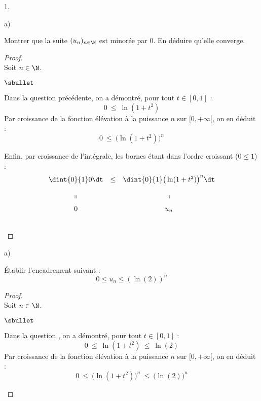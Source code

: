 \begin{noliste}{1.}
\begin{noliste}{a)}
  \item Montrer que la suite $(u_n)_{n \in \N}$ est minorée par
    $0$. En déduire qu'elle converge.

    \begin{proof}~\\%
      Soit $n \in \N$.
      \begin{noliste}{$\sbullet$}
      \item Dans la question précédente, on a démontré, pour tout $t
        \in [0, 1]$ :
        \[
        0 \ \leq \ \ln(1 + t^2)
        \]
        Par croissance de la fonction élévation à la puissance $n$ sur
        $[0, +\infty[$, on en déduit : 
        \[
        0 \ \leq \ \big( \ln(1 + t^2) \big)^n
        \]

      \item Enfin, par croissance de l'intégrale, les bornes étant
        dans l'ordre croissant ($0 \leq 1$) : 
        \[
        \begin{array}{ccc}
          \dint{0}{1} 0 \dt & \leq & \dint{0}{1} \big( \ln(1 + t^2)
          \big)^n \dt
          \\[.4cm]
          \shortparallel & & \shortparallel
          \\[.2cm]
          0 &  & u_n
        \end{array}
        \]
      \end{noliste}
      ~\\[-1cm]
    \end{proof}
  \end{noliste}  

\item
  \begin{noliste}{a)}
    \setlength{\itemsep}{2mm}
  \item Établir l'encadrement suivant :
    \[
    0 \leq u_n \leq (\ln(2))^n
    \]

    \begin{proof}~\\%
      Soit $n \in \N$.
      \begin{noliste}{$\sbullet$}
      \item Dans la question , on a démontré, pour tout $t
        \in [0, 1]$ :
        \[
        0 \ \leq \ \ln(1 + t^2) \ \leq \ \ln(2)
        \]
        Par croissance de la fonction élévation à la puissance $n$ sur
        $[0, +\infty[$, on en déduit : 
        \[
        0 \ \leq \ \big( \ln(1 + t^2) \big)^n \ \leq \ \big( \ln(2)
        \big)^n
        \]



\end{noliste}
\end{proof}
\end{noliste}
\end{noliste}
